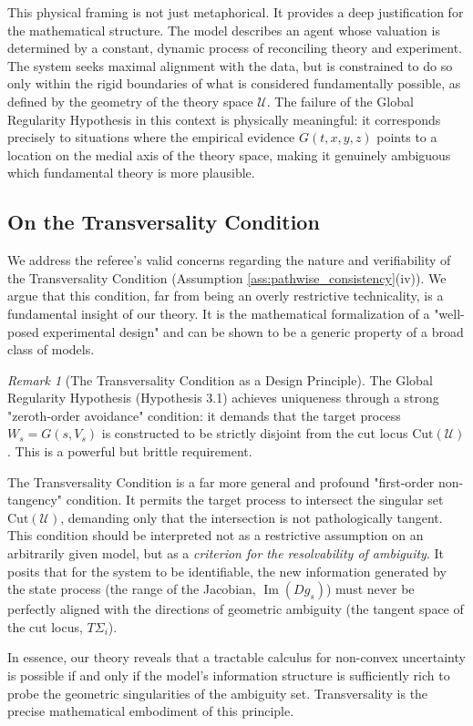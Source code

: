 \documentclass[12pt, letterpaper]{amsart}
\newcommand{\Ucal}{\mathcal{U}}
\DeclareMathOperator{\Image}{Im}
\theoremstyle{plain}
\theoremstyle{definition}
\theoremstyle{remark}
\newtheorem{remark}[theorem]{Remark}
\numberwithin{equation}{section} %
\begin{document}
This physical framing is not just metaphorical. It provides a deep justification for the mathematical structure. The model describes an agent whose valuation is determined by a constant, dynamic process of reconciling theory and experiment. The system seeks maximal alignment with the data, but is constrained to do so only within the rigid boundaries of what is considered fundamentally possible, as defined by the geometry of the theory space $\Ucal$. The failure of the Global Regularity Hypothesis in this context is physically meaningful: it corresponds precisely to situations where the empirical evidence $G(t,x,y,z)$ points to a location on the medial axis of the theory space, making it genuinely ambiguous which fundamental theory is more plausible.

\subsection{On the Transversality Condition}
\label{subsec:transversality_discussion}

We address the referee's valid concerns regarding the nature and verifiability of the Transversality Condition (Assumption \ref{ass:pathwise_consistency}(iv)). We argue that this condition, far from being an overly restrictive technicality, is a fundamental insight of our theory. It is the mathematical formalization of a "well-posed experimental design" and can be shown to be a generic property of a broad class of models.

\begin{remark}[The Transversality Condition as a Design Principle]
\label{rem:transversality_interpretation}
The Global Regularity Hypothesis (Hypothesis 3.1) achieves uniqueness through a strong "zeroth-order avoidance" condition: it demands that the target process \(W_s = G(s,V_s)\) is constructed to be strictly disjoint from the cut locus \(\mathrm{Cut}(\Ucal)\). This is a powerful but brittle requirement.

The Transversality Condition is a far more general and profound "first-order non-tangency" condition. It permits the target process to intersect the singular set \(\mathrm{Cut}(\Ucal)\), demanding only that the intersection is not pathologically tangent. This condition should be interpreted not as a restrictive assumption on an arbitrarily given model, but as a \emph{criterion for the resolvability of ambiguity}. It posits that for the system to be identifiable, the new information generated by the state process (the range of the Jacobian, \(\Image(Dg_s)\)) must never be perfectly aligned with the directions of geometric ambiguity (the tangent space of the cut locus, \(T\Sigma_i\)).

In essence, our theory reveals that a tractable calculus for non-convex uncertainty is possible if and only if the model's information structure is sufficiently rich to probe the geometric singularities of the ambiguity set. Transversality is the precise mathematical embodiment of this principle.
\end{remark}
\end{document}

